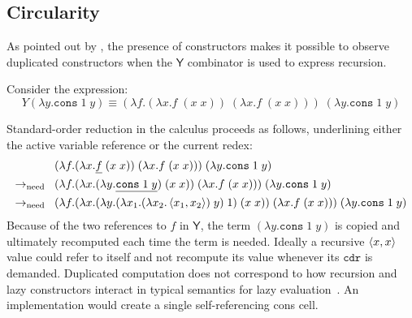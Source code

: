 \documentclass{LMCS}
\theoremstyle{plain}
\theoremstyle{remark}
\newcommand{\notion}[0]{\ensuremath{\rightarrow_{\mathrm{need}}}}
\newcommand{\consd}[2]{\ensuremath{\braket{#1,#2}}}
\begin{document}
\subsection{Circularity}
\label{sec:circularity}
As pointed out by \citet{ariola95need}, the presence of constructors makes it
possible to observe duplicated constructors when the $\mathsf{Y}$ combinator is
used to express recursion.

Consider the expression:
\begin{displaymath}
  Y(\lambda y.\mathtt{cons}\;1\;y) \equiv  
  (\lambda f.(\lambda x.f\;(x\;x))\;(\lambda x.f\;(x\;x)))\; 
  (\lambda y.\mathtt{cons}\;1\;y)
\end{displaymath}

Standard-order reduction in the calculus proceeds as follows, underlining
either the active variable reference or the current redex:
\begin{align*}
 &  (\lambda f.(\lambda x.\underline{f}\;(x\;x))\;(\lambda x.f\;(x\;x)))\; 
  (\lambda y.\mathtt{cons}\;1\;y) \\
\notion\enspace\ & (\lambda f.(\lambda x.(\lambda y.\underline{\mathtt{cons}\;1\;y})\;
  (x\;x))\;
  (\lambda x.f\;(x\;x)))\; 
  (\lambda y.\mathtt{cons}\;1\;y) \\
 \notion\enspace\ &   (\lambda f.(\lambda x.(\lambda y.(\lambda x_1.
  (\lambda x_2.\consd{x_1}{x_2})\;y)\;1)\;
  (x\;x))\;(\lambda x.f\;(x\;x)))\; 
  (\lambda y.\mathtt{cons}\;1\;y) 
\end{align*}
Because of the two references to $f$ in $\mathsf{Y}$, the term $(\lambda
y.\mathtt{cons}\;1\;y)$ is copied and ultimately recomputed each time the term
is needed.  Ideally a recursive $\consd{x}{x}$ value could refer to itself and
not recompute its value whenever its $\mathtt{cdr}$ is demanded.  Duplicated
computation does not correspond to how recursion and lazy constructors interact
in typical semantics for lazy evaluation~\cite{henderson76lazy}. An
implementation would create a single self-referencing cons cell.
\end{document}
